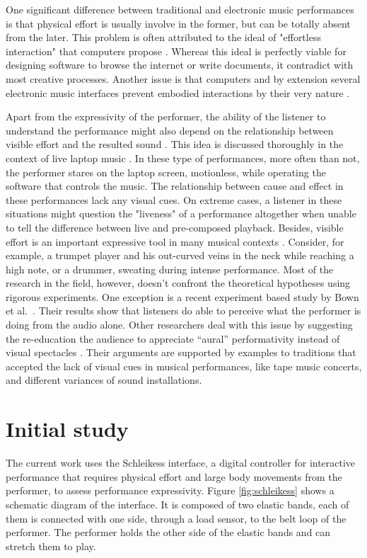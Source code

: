 \documentclass{sigchi}
\begin{document}
One significant difference between traditional and electronic music performances is that physical effort is usually involve in the former, but can be totally absent from the later.
This problem is often attributed to the ideal of "effortless interaction" that computers propose \cite{Ryan1992}.
Whereas this ideal is perfectly viable for designing software to browse the internet or write documents, it contradict with most creative processes.
Another issue is that computers and by extension several electronic music interfaces prevent embodied interactions by their very nature \cite{Armstrong2006}.

Apart from the expressivity of the performer, the ability of the listener to understand the performance might also depend on the relationship between visible effort and the resulted sound \cite{Verdonk2015}.
This idea is discussed thoroughly in the context of live laptop music \cite{Schloss2003}.
In these type of performances, more often than not, the performer stares on the laptop screen, motionless, while operating the software that controls the music.
The relationship between cause and effect in these performances lack any visual cues.
On extreme cases, a listener in these situations might question the "liveness" of a performance altogether when unable to tell the difference between live and pre-composed playback.
Besides, visible effort is an important expressive tool in many musical contexts \cite{Schloss2003}.
Consider, for example, a trumpet player and his out-curved veins in the neck while reaching a high note, or a drummer, sweating during intense performance.
Most of the research in the field, however, doesn't confront the theoretical hypotheses using rigorous experiments.
One exception is a recent experiment based study by Bown et al.\ \cite{Bown2014}.
Their results show that listeners do able to perceive what the performer is doing from the audio alone.
Other researchers deal with this issue by suggesting the re-education the audience to appreciate ``aural'' performativity instead of visual spectacles \cite{Stuart2003}.
Their arguments are supported by examples to traditions that accepted the lack of visual cues in musical performances, like tape music concerts, and different variances of sound installations.

\section{Initial study}

The current work uses the Schleikess interface, a digital controller for interactive performance that requires physical effort and large body movements from the performer, to assess performance expressivity.
Figure \ref{fig:schleikess} shows a schematic diagram of the interface.
It is composed of two elastic bands, each of them is connected with one side, through a load sensor, to the belt loop of the performer.
The performer holds the other side of the elastic bands and can stretch them to play.
\end{document}
